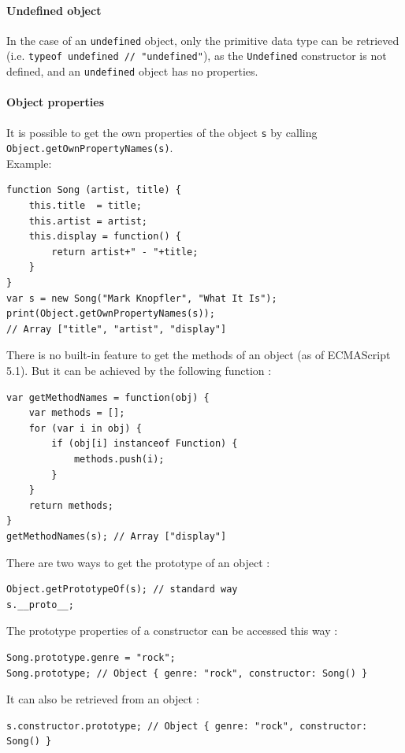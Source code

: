 \documentclass[a4paper,10pt]{article}
\begin{document}
\paragraph{Undefined object}{
In the case of an \lstinline|undefined| object, only the primitive data type can be retrieved (i.e. \lstinline|typeof undefined // "undefined"|), as the \lstinline|Undefined| constructor is not defined, and an \lstinline|undefined| object has no properties.
}


\paragraph{Object properties}{
It is possible to get the own properties of the object \lstinline|s| by calling \lstinline|Object.getOwnPropertyNames(s)|\cite{js:getOwnPropertyNames}. \\
Example:
\begin{lstlisting}
function Song (artist, title) {
    this.title  = title;
    this.artist = artist;
    this.display = function() {
        return artist+" - "+title;
    }
}
var s = new Song("Mark Knopfler", "What It Is");
print(Object.getOwnPropertyNames(s));
// Array ["title", "artist", "display"]
\end{lstlisting}
}


There is no built-in feature to get the methods of an object (as of ECMAScript 5.1). But it can be achieved by the following function :
\begin{lstlisting}
var getMethodNames = function(obj) {
    var methods = [];
    for (var i in obj) {
        if (obj[i] instanceof Function) {
            methods.push(i);
        }
    }
    return methods;
}
getMethodNames(s); // Array ["display"]
\end{lstlisting}


There are two ways to get the prototype of an object :
\begin{lstlisting}
Object.getPrototypeOf(s); // standard way
s.__proto__;
\end{lstlisting}


The prototype properties of a constructor can be accessed this way :
\begin{lstlisting}
Song.prototype.genre = "rock";
Song.prototype; // Object { genre: "rock", constructor: Song() }
\end{lstlisting}

It can also be retrieved from an object :
\begin{lstlisting}
s.constructor.prototype; // Object { genre: "rock", constructor: Song() }
\end{lstlisting}
\end{document}
